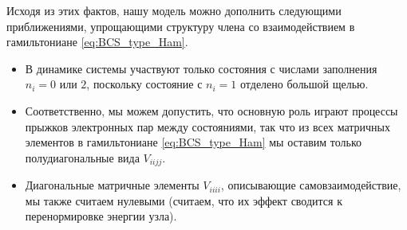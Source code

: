 Исходя из этих фактов, нашу модель можно дополнить следующими приближениями, упрощающими структуру члена со взаимодействием в гамильтониане \eqref{eq:BCS_type_Ham}.
\begin{itemize}
	\item В динамике системы участвуют только состояния с числами заполнения $n_i = 0\text{ или }2$, поскольку состояние с $n_i = 1$ отделено большой щелью.
	\item Соответственно, мы можем допустить, что основную роль играют процессы прыжков электронных пар между состояниями, так что из всех матричных элементов в гамильтониане \eqref{eq:BCS_type_Ham} мы оставим только полудиагональные вида $V_{iijj}$.
	\item Диагональные матричные элементы $V_{iiii}$, описывающие самовзаимодействие, мы также считаем нулевыми (считаем, что их эффект сводится к перенормировке энергии узла). 
\end{itemize}


